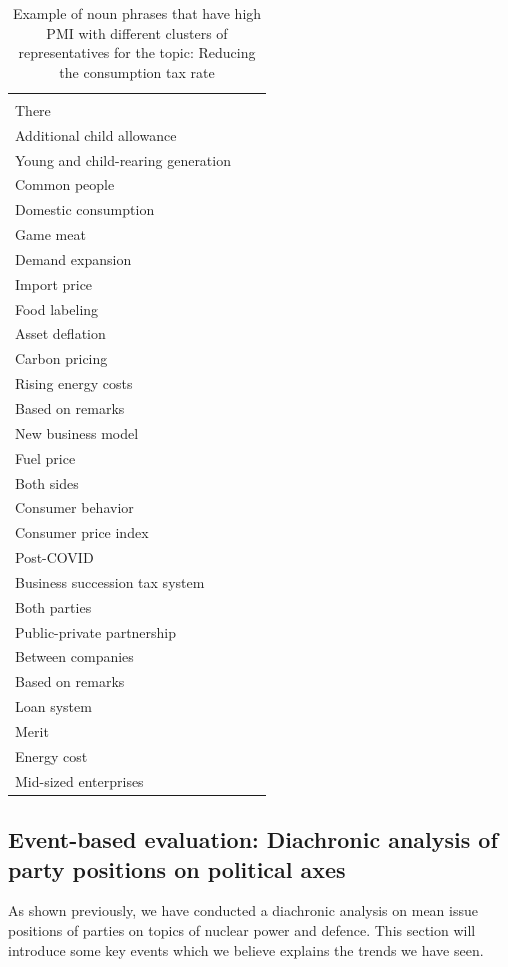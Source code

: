 \documentclass[final,5p,times,twocolumn,authoryear]{elsarticle}
\begin{document}
\begin{table}[htbp]
\begin{tabularx}{\textwidth}{|>{\centering\arraybackslash}X|>{\centering\arraybackslash}X|>{\centering\arraybackslash}X|}
\begin{tabular}[c]{@{}l@{}}
	Animal welfare \\ There \\ Additional child allowance \\ Young and child-rearing generation \\ Common people \\ Domestic consumption \\ Game meat \\ Demand expansion \\ Import price \\ Food labeling \\ Asset deflation \\ Carbon pricing \\ Rising energy costs \\ Based on remarks \\ New business model \\ Fuel price \\ Both sides \\ Consumer behavior \\ Consumer price index \\ Post-COVID \\ Business succession tax system \\ Both parties \\ Public-private partnership \\ Between companies \\ Based on remarks \\ Loan system \\ Merit \\ Energy cost \\ Mid-sized enterprises
\end{tabular} \\ \hline
\end{tabularx}
\caption{Example of noun phrases that have high PMI with different clusters of representatives for the topic: Reducing the consumption tax rate}
\label{table:PMI-taxrate}
\end{table}
\FloatBarrier

\subsection{Event-based evaluation: Diachronic analysis of party positions on political axes}
\label{section: event-based}
As shown previously, we have conducted a diachronic analysis on mean issue positions of parties on topics of nuclear power and defence. This section will introduce some key events which we believe explains the trends we have seen. 
\end{document}
